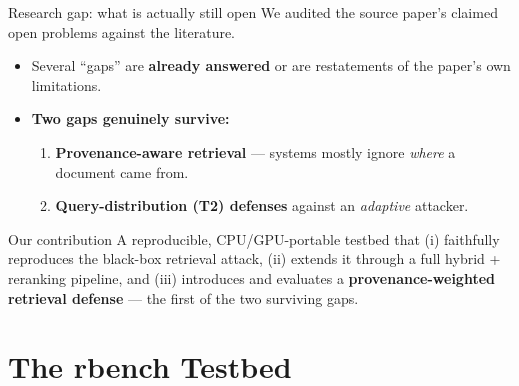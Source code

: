 \documentclass[aspectratio=169,11pt]{beamer}
\newcommand{\good}[1]{\textcolor{rbgreen}{\textbf{#1}}}
\begin{document}
\begin{frame}{Research gap: what is actually still open}
  \small
  We audited the source paper's claimed open problems against the literature.
  \begin{itemize}
    \item Several ``gaps'' are \textbf{already answered} or are restatements of the paper's own limitations.
    \item \good{Two gaps genuinely survive:}
      \begin{enumerate}
        \item \textbf{Provenance-aware retrieval} --- systems mostly ignore \emph{where} a document came from.
        \item \textbf{Query-distribution (T2) defenses} against an \emph{adaptive} attacker.
      \end{enumerate}
  \end{itemize}
  \begin{exampleblock}{Our contribution}
    A reproducible, CPU/GPU-portable testbed that (i) faithfully reproduces the black-box retrieval attack, (ii) extends it through a full hybrid + reranking pipeline, and (iii) introduces and evaluates a \textbf{provenance-weighted retrieval defense} --- the first of the two surviving gaps.
  \end{exampleblock}
\end{frame}

\section{The rbench Testbed}
\end{document}
